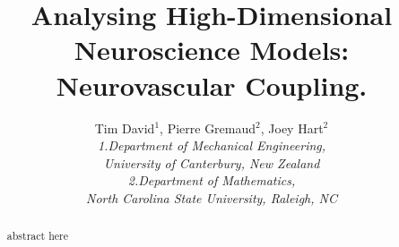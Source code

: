 \documentclass[12pt]{article}
\numberwithin{equation}{section}
\begin{document}
\title{Analysing High-Dimensional Neuroscience Models: Neurovascular Coupling. }
\author{ Tim David$^{1}$, Pierre Gremaud$^{2}$, Joey Hart$^{2}$\\
\textit{1.Department of Mechanical Engineering,} \\
\textit{University of Canterbury, New Zealand}\\
\textit{2.Department of Mathematics,}\\
\textit{North Carolina State University, Raleigh, NC}\\
}
\maketitle
\thispagestyle{empty}

\begin{abstract}
abstract here 
\end{abstract}


  









\end{document}
